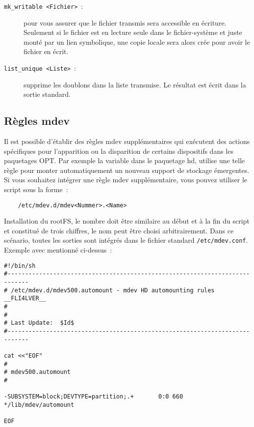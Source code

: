 \begin{description}

\item[\texttt{mk\_writable <Fichier>}~:] pour vous assurer que le fichier transmis
sera accessible en écriture. Seulement si le fichier est en lecture seule dans
le fichier-système et juste monté par un lien symbolique, une copie locale
sera alors crée pour avoir le fichier en écrit.

\item[\texttt{list\_unique <Liste>}~:] supprime les doublons dans la liste transmise.
Le résultat est écrit dans la sortie standard.

\end{description}

\subsection{Règles mdev}

Il est possible d'établir des règles mdev supplémentaires qui exécutent des
actions spécifiques pour l'apparition ou la disparition de certains dispositifs
dans les paquetages OPT. Par exemple la variable  dans le
paquetage hd, utilise une telle règle pour monter automatiquement un nouveau
support de stockage émergentes. Si vous souhaitez intégrer une règle mdev
supplémentaire, vous pouvez utiliser le script sous la forme~:

\begin{verbatim}
    /etc/mdev.d/mdev<Nummer>.<Name>
\end{verbatim}

Installation du rootFS, le nombre doit être similaire au début et à la fin du script
et constitué de trois chiffres, le nom peut être choisi arbitrairement. Dans ce
scénario, toutes les sorties sont intégrés dans le fichier standard
\texttt{/etc/mdev.conf}. Exemple avec  mentionné ci-dessus~:

\begin{small}
\begin{verbatim}
#!/bin/sh
#----------------------------------------------------------------------------
# /etc/mdev.d/mdev500.automount - mdev HD automounting rules     __FLI4LVER__
#
#
# Last Update:  $Id$
#----------------------------------------------------------------------------

cat <<"EOF"
#
# mdev500.automount
#

-SUBSYSTEM=block;DEVTYPE=partition;.+       0:0 660 */lib/mdev/automount

EOF
\end{verbatim}
\end{small}

